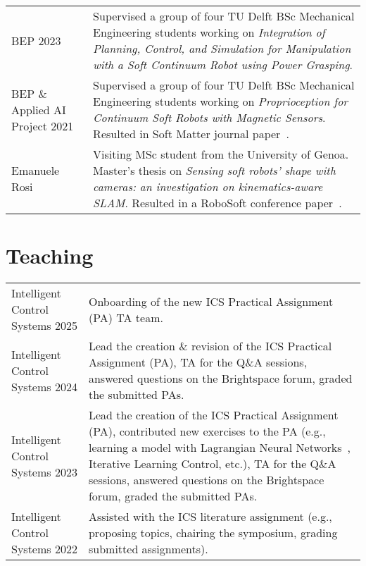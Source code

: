 \begin{longtable}{p{} p{}}
    BEP 2023 & Supervised a group of four TU Delft BSc Mechanical Engineering students working on \emph{Integration of Planning, Control, and Simulation for Manipulation with a Soft Continuum Robot using Power Grasping}.\\
    BEP \& Applied AI Project 2021 & Supervised a group of four TU Delft BSc Mechanical Engineering students working on \emph{Proprioception for Continuum Soft Robots with Magnetic Sensors}. Resulted in Soft Matter journal paper~\citep{baaij2023learning}.\\
    Emanuele Rosi & Visiting MSc student from the University of Genoa. Master's thesis on \emph{Sensing soft robots' shape with cameras: an investigation on kinematics-aware SLAM}. Resulted in a RoboSoft conference paper~\citep{rosi2022sensing}.\\
\end{longtable}

\section*{Teaching}
\noindent
\begin{longtable}{p{} p{}}
    Intelligent Control \newline Systems 2025 & Onboarding of the new ICS Practical Assignment (PA) TA team.\\
    Intelligent Control \newline Systems 2024 & Lead the creation \& revision of the ICS Practical Assignment (PA), TA for the Q\&A sessions, answered questions on the Brightspace forum, graded the submitted PAs.\\
    Intelligent Control \newline Systems 2023 & Lead the creation of the ICS Practical Assignment (PA), contributed new exercises to the PA (e.g., learning a model with Lagrangian Neural Networks~\citep{lutter2019deep}, Iterative Learning Control, etc.), TA for the Q\&A sessions, answered questions on the Brightspace forum, graded the submitted PAs.\\
    Intelligent Control \newline Systems 2022 & Assisted with the ICS literature assignment (e.g., proposing topics, chairing the symposium, grading submitted assignments).\\
\end{longtable}

